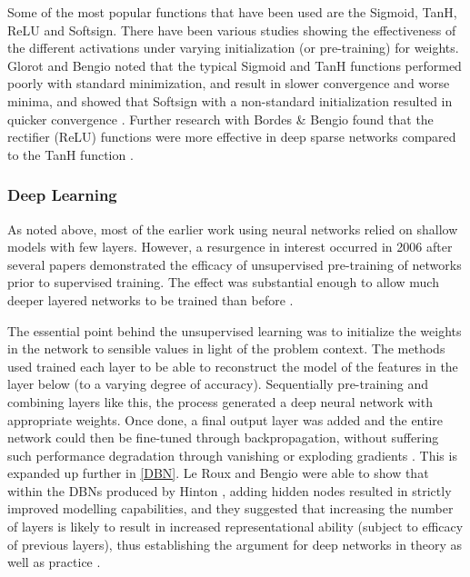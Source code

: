\documentclass[a4paper,latin]{paper}
\begin{document}
Some of the most popular functions that have been used are the Sigmoid, TanH, ReLU and Softsign. There have 
been various studies showing the effectiveness of the different activations under varying initialization (or pre-training) 
for weights. Glorot and Bengio noted that the typical Sigmoid and TanH functions performed poorly with standard 
minimization, and result in slower convergence and worse minima, and showed that Softsign with a non-standard 
initialization resulted in quicker convergence \cite{Glorot}. Further research with Bordes \& Bengio found that the 
rectifier (ReLU) functions were  more effective in deep sparse networks compared to the TanH function \cite{Glorot2}.

\subsubsection{Deep Learning}

As noted above, most of the earlier work using neural networks relied on shallow models with few layers. 
However, a resurgence in interest occurred in 2006 after several papers demonstrated the efficacy of 
unsupervised pre-training of networks prior to supervised training. The effect was substantial enough to allow 
much deeper layered networks to be trained than before \cite{Bengio1, Hinton1}.
\hfill \break 
 
 The essential point behind the unsupervised learning was to initialize the weights in the network to sensible 
 values in light of the problem context. The methods used trained each layer to be able to reconstruct the model 
 of the features in the layer below (to a varying degree of accuracy). Sequentially pre-training and combining 
 layers like this, the process generated a deep neural network with appropriate weights. Once done, a final output 
 layer was added and the entire network could then be fine-tuned through backpropagation, without suffering 
 such performance degradation through vanishing or exploding gradients \cite{Hinton1, Ranzato1, Hinton2}. This is 
 expanded up further in \ref{DBN}. Le Roux and Bengio were able to show that within the DBNs produced by 
 Hinton \cite{Hinton1}, adding hidden nodes resulted in strictly improved modelling capabilities, and they suggested 
 that increasing the number of layers is likely to result in increased representational ability (subject to efficacy of 
 previous layers), thus establishing the argument for deep networks in theory as well as practice \cite{LeRoux}.
\hfill \break 
\end{document}
